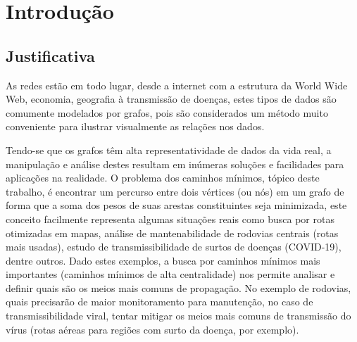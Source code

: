 \chapter{Introdução}
\section{Justificativa}
As redes estão em todo lugar, desde a internet com a estrutura da World Wide Web, economia, geografia à transmissão de doenças, estes tipos de dados são comumente modelados por grafos, pois são considerados um método muito conveniente para ilustrar visualmente as relações nos dados.

Tendo-se que os grafos têm alta representatividade de dados da vida real, a manipulação e análise destes resultam em inúmeras soluções e facilidades para aplicações na realidade. O problema dos caminhos mínimos, tópico deste trabalho, é encontrar um percurso entre dois vértices (ou nós) em um grafo de forma que a soma dos pesos de suas arestas constituintes seja minimizada, este conceito facilmente representa algumas situações reais como busca por rotas otimizadas em mapas, análise de mantenabilidade de rodovias centrais (rotas mais usadas), estudo de transmissibilidade de surtos de doenças (COVID-19), dentre outros. Dado estes exemplos, a busca por caminhos mínimos mais importantes (caminhos mínimos de alta centralidade) nos permite analisar e definir quais são os meios mais comuns de propagação. No exemplo de rodovias, quais precisarão de maior monitoramento para manutenção, no caso de transmissibilidade viral, tentar mitigar os meios mais comuns de transmissão do vírus (rotas aéreas para regiões com surto da doença, por exemplo).


